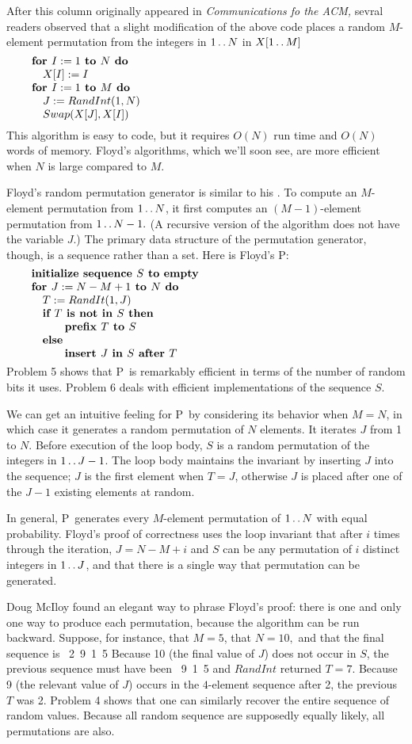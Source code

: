 After this column originally appeared in {\sl Communications fo the ACM,\/}
sevral readers observed that a slight modification of the above code places a
random $M$-element permutation from the integers in $1\mathinner{\ldotp\ldotp} N$ in
$X[1\mathinner{\ldotp\ldotp} M]$
$$\vbox{\let\par=\endgraf
\obeylines\sfcode`;=3000
{\bf for $I:=1$ to $N$ do}
\quad $X[I]:=I$
{\bf for $I:=1$ to $M$ do}
\quad $J:= RandInt(1, N)$
\quad $Swap(X[J], X[I])$
}$$
This algorithm is easy to code, but it requires $O(N)$ run time and $O(N)$ words
of memory. Floyd's algorithms, which we'll soon see, are more efficient when $N$
is large compared to $M$.

Floyd's random permutation generator is similar to his . To compute an
$M$-element permutation from $1\mathinner{\ldotp\ldotp} N$, it first computes an $(M-1)$-element
permutation from $1\mathinner{\ldotp\ldotp} N-1.$ (A recursive version of the algorithm does not
have the variable $J.$) The primary data structure of the permutation generator,
though, is a sequence rather than a set. Here is Floyd's \alg P:
$$\vbox{\let\par=\endgraf
\obeylines\sfcode`;=3000
{\bf initialize sequence $S$ to empty}
{\bf for $J:=N-M+1$ to $N$ do}
\quad $T:=RandIt(1,J)$
\quad {\bf if $T$ is not in $S$ then}
\qquad\quad {\bf prefix $T$ to $S$}
\quad {\bf else}
\qquad\quad {\bf insert $J$ in $S$ after $T$}
}$$
Problem 5 shows that \alg P\ is remarkably efficient in terms of the number of
random bits it uses. Problem 6 deals with efficient implementations of the
sequence $S.$

We can get an intuitive feeling for \alg P\ by considering its behavior when
$M=N$, in which case it generates a random permutation of $N$ elements. It
iterates $J$ from 1 to $N$. Before execution of the loop body, $S$ is a
random permutation of the integers in $1\mathinner{\ldotp\ldotp} J-1$. The loop body maintains
the invariant by inserting $J$ into the sequence; $J$ is the first element
when $T=J$, otherwise $J$ is placed after one of the $J-1$ existing elements
at random.

In general, \alg P\ generates every $M$-element permutation of $1\mathinner{\ldotp\ldotp} N$
with equal probability. Floyd's proof of correctness uses the loop invariant
that after $i$ times through the iteration, $J=N-M+i$ and $S$ can be any
permutation of $i$ distinct integers in $1\mathinner{\ldotp\ldotp} J$, and that there is a
single way that permutation can be generated.

Doug McIloy found an elegant way to phrase Floyd's proof: there is one and
only one way to produce each permutation, because the algorithm can be run
backward. Suppose, for instance, that $M=5$, that $N=10,$ and that the final
sequence is
\ 2\ 9\ 1\ 5
\enddisplay
Because 10 (the final value of $J$) does not occur in $S$, the previous
sequence must have been
\ 9\ 1\ 5
\enddisplay
and $RandInt$ returned $T=7.$ Because 9 (the relevant value of $J$) occurs
in the $4$-element sequence after 2, the previous $T$ was 2. Problem 4 shows
that one can similarly recover the entire sequence of random values. Because
all random sequence are supposedly equally likely, all permutations are also.

